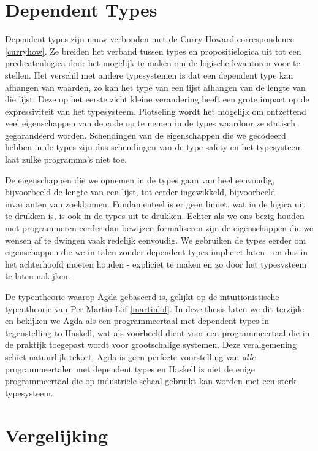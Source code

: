 \section{Dependent Types}

Dependent types zijn nauw verbonden met de Curry-Howard correspondence
\ref{curryhow}. Ze breiden het verband tussen types en propositielogica uit tot
een predicatenlogica door het mogelijk te maken om de logische kwantoren voor
te stellen. Het verschil met andere typesystemen is dat een dependent type kan
afhangen van waarden, zo kan het type van een lijst afhangen van de lengte van
die lijst. Deze op het eerste zicht kleine verandering heeft een grote impact
op de expressiviteit van het typesysteem. Plotseling wordt het mogelijk om
ontzettend veel eigenschappen van de code op te nemen in de types waardoor ze
statisch gegarandeerd worden. Schendingen van de eigenschappen die we gecodeerd
hebben in de types zijn dus schendingen van de type safety en het typesysteem
laat zulke programma's niet toe.

De eigenschappen die we opnemen in de types gaan van heel eenvoudig,
bijvoorbeeld de lengte van een lijst, tot eerder ingewikkeld, bijvoorbeeld
invarianten van zoekbomen. Fundamenteel is er geen limiet, wat in de logica uit
te drukken is, is ook in de types uit te drukken. Echter als we ons bezig
houden met programmeren eerder dan bewijzen formaliseren zijn de eigenschappen
die we wensen af te dwingen vaak redelijk eenvoudig. We gebruiken de types
eerder om eigenschappen die we in talen zonder dependent types impliciet laten
- en dus in het achterhoofd moeten houden - expliciet te maken en zo door het
typesysteem te laten nakijken.

De typentheorie waarop Agda gebaseerd is, gelijkt op de intuïtionistische
typentheorie van Per Martin-Löf \ref{martinlof}. In deze thesis laten we dit
terzijde en bekijken we Agda als een programmeertaal met dependent types in
tegenstelling to Haskell, wat als voorbeeld dient voor een programmeertaal die
in de praktijk toegepast wordt voor grootschalige systemen. Deze veralgemening
schiet natuurlijk tekort, Agda is geen perfecte voorstelling van \emph{alle}
programmeertalen met dependent types en Haskell is niet de enige
programmeertaal die op industriële schaal gebruikt kan worden met een sterk
typesysteem.


\section{Vergelijking}

